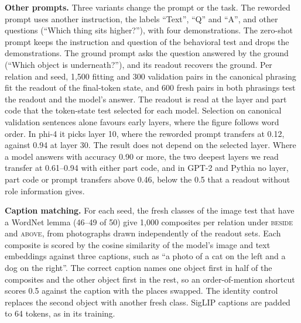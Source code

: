 \documentclass[10pt]{article}
\theoremstyle{plain}
\theoremstyle{remark}
\begin{document}
\textbf{Other prompts.}\label{app:e16} Three variants change the prompt or the task. The reworded prompt uses another instruction, the labels ``Text'', ``Q'' and ``A'', and other questions (``Which thing sits higher?''), with four demonstrations. The zero-shot prompt keeps the instruction and question of the behavioral test and drops the demonstrations. The ground prompt asks the question answered by the ground (``Which object is underneath?''), and its readout recovers the ground. Per relation and seed, 1{,}500 fitting and 300 validation pairs in the canonical phrasing fit the readout of the final-token state, and 600 fresh pairs in both phrasings test the readout and the model's answer. The readout is read at the layer and part code that the token-state test selected for each model. Selection on canonical validation sentences alone favours early layers, where the figure follows word order. In phi-4 it picks layer 10, where the reworded prompt transfers at 0.12, against 0.94 at layer 30. The result does not depend on the selected layer. Where a model answers with accuracy 0.90 or more, the two deepest layers we read transfer at 0.61--0.94 with either part code, and in GPT-2 and Pythia no layer, part code or prompt transfers above 0.46, below the 0.5 that a readout without role information gives.

\textbf{Caption matching.}\label{app:e17} For each seed, the fresh classes of the image test that have a WordNet lemma (46--49 of 50) give 1{,}000 composites per relation under \textsc{beside} and \textsc{above}, from photographs drawn independently of the readout sets. Each composite is scored by the cosine similarity of the model's image and text embeddings against three captions, such as ``a photo of a cat on the left and a dog on the right''. The correct caption names one object first in half of the composites and the other object first in the rest, so an order-of-mention shortcut scores 0.5 against the caption with the places swapped. The identity control replaces the second object with another fresh class. SigLIP captions are padded to 64 tokens, as in its training.
\end{document}
